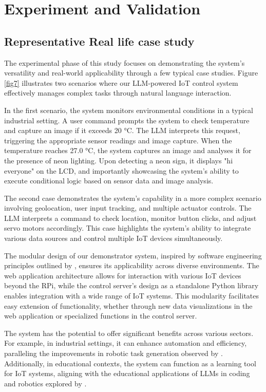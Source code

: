 \documentclass{ieeeaccess}
\begin{document}
\section{Experiment and Validation}\label{sec:experiment}

\subsection{Representative Real life case study}
The experimental phase of this study focuses on demonstrating the system's versatility and real-world applicability through a few typical case studies. Figure \ref{fig7} illustrates two scenarios where our LLM-powered IoT control system effectively manages complex tasks through natural language interaction.

In the first scenario, the system monitors environmental conditions in a typical industrial setting. A user command prompts the system to check temperature and capture an image if it exceeds 20 °C. The LLM interprets this request, triggering the appropriate sensor readings and image capture. When the temperature reaches 27.0 °C, the system captures an image and analyses it for the presence of neon lighting. Upon detecting a neon sign, it displays "hi everyone" on the LCD, and importantly showcasing the system's ability to execute conditional logic based on sensor data and image analysis.

The second case demonstrates the system's capability in a more complex scenario involving geolocation, user input tracking, and multiple actuator controls. The LLM interprets a command to check location, monitor button clicks, and adjust servo motors accordingly. This case highlights the system's ability to integrate various data sources and control multiple IoT devices simultaneously.

The modular design of our demonstrator system, inspired by software engineering principles outlined by \citet{taylor2010software}, ensures its applicability across diverse environments. The web application architecture allows for interaction with various IoT devices beyond the RPi, while the control server's design as a standalone Python library enables integration with a wide range of IoT systems. This modularity facilitates easy extension of functionality, whether through new data visualizations in the web application or specialized functions in the control server.

The system has the potential to offer significant benefits across various sectors. For example, in industrial settings, it can enhance automation and efficiency, paralleling the improvements in robotic task generation observed by \citet{wang2024gensimgeneratingroboticsimulation}. Additionally, in educational contexts, the system can function as a learning tool for IoT systems, aligning with the educational applications of LLMs in coding and robotics explored by \citet{shu2024llmscodingroboticseducation}.
\end{document}
